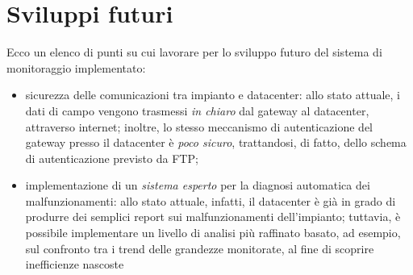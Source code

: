 \clearpage{\pagestyle{empty}\cleardoublepage}
\chapter{Sviluppi futuri}
Ecco un elenco di punti su cui lavorare per lo sviluppo futuro del sistema di monitoraggio
implementato:
%
\begin{itemize}
\item sicurezza delle comunicazioni tra impianto e datacenter:
      allo stato attuale, i dati di campo vengono trasmessi \emph{in chiaro} dal gateway al datacenter, 
      attraverso internet; inoltre, lo stesso meccanismo di autenticazione del gateway presso il datacenter 
      \`e \emph{poco sicuro}, trattandosi, di fatto, dello schema di autenticazione previsto da FTP;
%      
\item implementazione di un \emph{sistema esperto} per la diagnosi automatica dei malfunzionamenti:
      allo stato attuale, infatti, il datacenter \`e gi\`a in grado di produrre dei semplici report
      sui malfunzionamenti dell'impianto; tuttavia, \`e possibile implementare un livello di analisi
      pi\`u raffinato basato, ad esempio, sul confronto tra i trend delle grandezze monitorate,
      al fine di scoprire inefficienze nascoste
\end{itemize}
